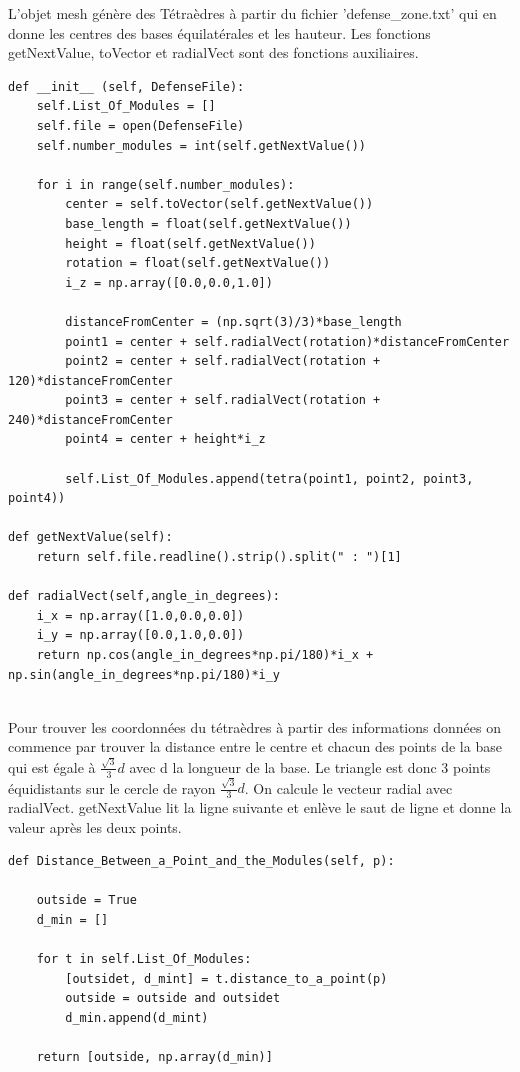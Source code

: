 \documentclass[french]{article}
\begin{document}
L'objet mesh génère des Tétraèdres à partir du fichier 'defense\_zone.txt' qui en donne les centres des bases équilatérales et
les hauteur. Les fonctions getNextValue, toVector et radialVect sont des fonctions auxiliaires.

\begin{verbatim}
def __init__ (self, DefenseFile):
	self.List_Of_Modules = []
	self.file = open(DefenseFile)
	self.number_modules = int(self.getNextValue())
	
	for i in range(self.number_modules):
		center = self.toVector(self.getNextValue())
		base_length = float(self.getNextValue())
		height = float(self.getNextValue())
		rotation = float(self.getNextValue())
		i_z = np.array([0.0,0.0,1.0]) 
		
		distanceFromCenter = (np.sqrt(3)/3)*base_length
		point1 = center + self.radialVect(rotation)*distanceFromCenter
		point2 = center + self.radialVect(rotation + 120)*distanceFromCenter
		point3 = center + self.radialVect(rotation + 240)*distanceFromCenter
		point4 = center + height*i_z
		
		self.List_Of_Modules.append(tetra(point1, point2, point3, point4))

def getNextValue(self):
	return self.file.readline().strip().split(" : ")[1]

def radialVect(self,angle_in_degrees):
	i_x = np.array([1.0,0.0,0.0])
	i_y = np.array([0.0,1.0,0.0])
	return np.cos(angle_in_degrees*np.pi/180)*i_x + np.sin(angle_in_degrees*np.pi/180)*i_y


\end{verbatim}

Pour trouver les coordonnées du tétraèdres à partir des informations données on commence par
trouver la distance entre le centre et chacun des points de la base qui est égale
à $\frac{\sqrt{3}}{3}d$ avec d la longueur de la base. Le triangle est donc 3 points équidistants sur le cercle de rayon
$\frac{\sqrt{3}}{3}d$. On calcule le vecteur radial avec radialVect. getNextValue lit la ligne suivante et enlève le saut de ligne
et donne la valeur après les deux points.

\begin{verbatim}
def Distance_Between_a_Point_and_the_Modules(self, p):

	outside = True
	d_min = []
	
	for t in self.List_Of_Modules:
		[outsidet, d_mint] = t.distance_to_a_point(p)
		outside = outside and outsidet
		d_min.append(d_mint)
	
	return [outside, np.array(d_min)]
\end{verbatim}
\end{document}
